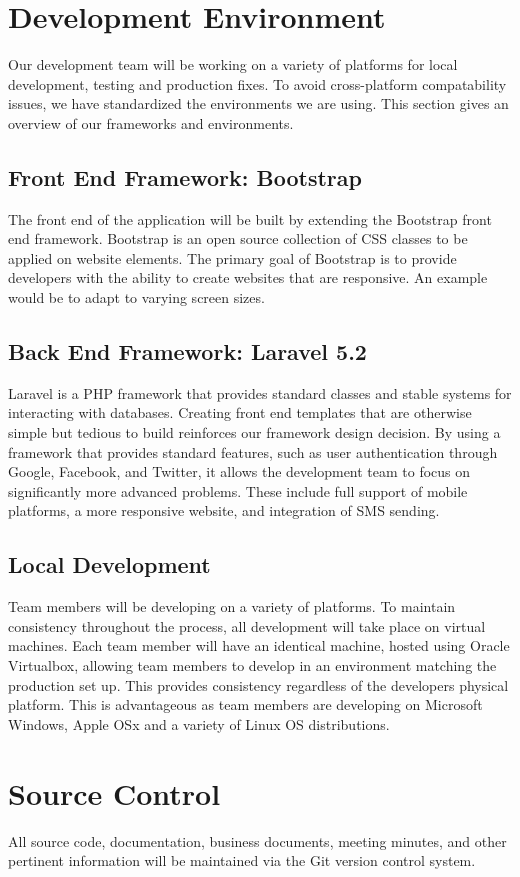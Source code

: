 \documentclass[]{article}
\begin{document}
\section{Development Environment}
Our development team will be working on a variety of platforms for local development, testing and production fixes. To avoid cross-platform compatability issues, we have standardized the environments we are using. This section gives an overview of our frameworks and environments.
\subsection{Front End Framework: Bootstrap}
The front end of the application will be built by extending the Bootstrap front end framework. Bootstrap is an open source collection of CSS classes to be applied on website elements. The primary goal of Bootstrap is to provide developers with the ability to create websites that are responsive. An example would be to adapt to varying screen sizes.
\subsection{Back End Framework: Laravel 5.2}
Laravel is a PHP framework that provides standard classes and stable systems for interacting with databases. Creating front end templates that are otherwise simple but tedious to build reinforces our framework design decision. By using a framework that provides standard features, such as user authentication through Google, Facebook, and Twitter, it allows the development team to focus on significantly more advanced problems. These include full support of mobile platforms, a more responsive website, and integration of SMS sending.
\subsection{Local Development}
Team members will be developing on a variety of platforms. To maintain consistency throughout the process, all development will take place on virtual machines. Each team member will have an identical machine, hosted using Oracle Virtualbox, allowing team members to develop in an environment matching the production set up. This provides consistency regardless of the developers physical platform. This is advantageous as team members are developing on Microsoft Windows, Apple OSx and a variety of Linux OS distributions.

\section{Source Control}
All source code, documentation, business documents, meeting minutes, and other pertinent information will be maintained via the Git version control system.
\end{document}
